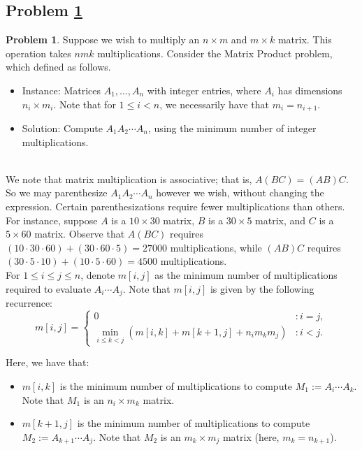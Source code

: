 \documentclass[11pt]{article}
\theoremstyle{definition}
\theoremstyle{definition}
\newtheorem{required}{Problem}
\theoremstyle{definition}
\begin{document}
\subsection{Problem \ref{Recurrence2}}
\begin{required} \label{Recurrence2}
Suppose we wish to multiply an $n \times m$ and $m \times k$ matrix. This operation takes $nmk$ multiplications. Consider the \textsf{Matrix Product} problem, which defined as follows.
\begin{itemize}
\item \textsf{Instance:} Matrices $A_{1}, \ldots, A_{n}$ with integer entries, where $A_{i}$ has dimensions $n_{i} \times m_{i}$. Note that for $1 \leq i < n$, we necessarily have that $m_{i} = n_{i+1}$.

\item \textsf{Solution:} Compute $A_{1}A_{2} \cdots A_{n}$, using the minimum number of integer multiplications.
\end{itemize}


\noindent \\ We note that matrix multiplication is associative; that is, $A(BC) = (AB)C$. So we may parenthesize $A_{1}A_{2} \cdots A_{n}$ however we wish, without changing the expression. Certain parenthesizations require fewer multiplications than others. For instance, suppose $A$ is a $10 \times 30$ matrix, $B$ is a $30 \times 5$ matrix, and $C$ is a $5 \times 60$ matrix. Observe that $A(BC)$ requires $(10 \cdot 30 \cdot 60) + (30 \cdot 60 \cdot 5) = 27000$ multiplications, while $(AB)C$ requires $(30 \cdot 5 \cdot 10) + (10 \cdot 5 \cdot 60) = 4500$ multiplications. \\

\noindent For $1 \leq i \leq j \leq n$, denote $m[i, j]$ as the minimum number of multiplications required to evaluate $A_{i} \cdots A_{j}$. Note that $m[i, j]$ is given by the following recurrence:
\[
m[i, j] = \begin{cases} 
0 & : i = j, \\
\displaystyle \min_{i \leq k < j} (m[i, k] + m[k+1, j] + n_{i}m_{k}m_{j}) & : i < j.
\end{cases}
\]

\noindent Here, we have that:
\begin{itemize}
\item $m[i, k]$ is the minimum number of multiplications to compute $M_{1} := A_{i} \cdots A_{k}$. Note that $M_{1}$ is an $n_{i} \times m_{k}$ matrix.

\item $m[k+1, j]$ is the minimum number of multiplications to compute $M_{2} := A_{k+1} \cdots A_{j}$. Note that $M_{2}$ is an $m_{k} \times m_{j}$ matrix (here, $m_{k} = n_{k+1}$).


\end{itemize}
\end{required}
\end{document}
